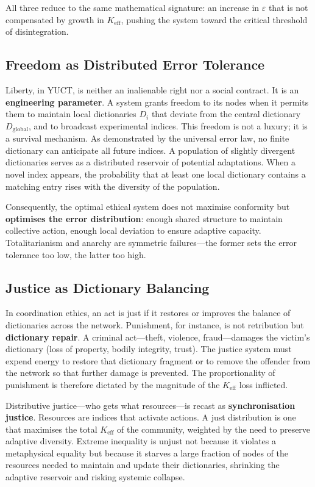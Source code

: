 \documentclass[12pt,a4paper]{article}
\begin{document}
	All three reduce to the same mathematical signature: an increase in $\varepsilon$ that is not compensated by growth in $K_{\mathrm{eff}}$, pushing the system toward the critical threshold of disintegration.
	
	\subsection{Freedom as Distributed Error Tolerance}
	
	Liberty, in YUCT, is neither an inalienable right nor a social contract. It is an \textbf{engineering parameter}. A system grants freedom to its nodes when it permits them to maintain local dictionaries $D_i$ that deviate from the central dictionary $D_{\text{global}}$, and to broadcast experimental indices. This freedom is not a luxury; it is a survival mechanism. As demonstrated by the universal error law, no finite dictionary can anticipate all future indices. A population of slightly divergent dictionaries serves as a distributed reservoir of potential adaptations. When a novel index appears, the probability that at least one local dictionary contains a matching entry rises with the diversity of the population.
	
	Consequently, the optimal ethical system does not maximise conformity but \textbf{optimises the error distribution}: enough shared structure to maintain collective action, enough local deviation to ensure adaptive capacity. Totalitarianism and anarchy are symmetric failures—the former sets the error tolerance too low, the latter too high.
	
	\subsection{Justice as Dictionary Balancing}
	
	In coordination ethics, an act is just if it restores or improves the balance of dictionaries across the network. Punishment, for instance, is not retribution but \textbf{dictionary repair}. A criminal act—theft, violence, fraud—damages the victim’s dictionary (loss of property, bodily integrity, trust). The justice system must expend energy to restore that dictionary fragment or to remove the offender from the network so that further damage is prevented. The proportionality of punishment is therefore dictated by the magnitude of the $K_{\mathrm{eff}}$ loss inflicted.
	
	Distributive justice—who gets what resources—is recast as \textbf{synchronisation justice}. Resources are indices that activate actions. A just distribution is one that maximises the total $K_{\mathrm{eff}}$ of the community, weighted by the need to preserve adaptive diversity. Extreme inequality is unjust not because it violates a metaphysical equality but because it starves a large fraction of nodes of the resources needed to maintain and update their dictionaries, shrinking the adaptive reservoir and risking systemic collapse.
	
\end{document}
